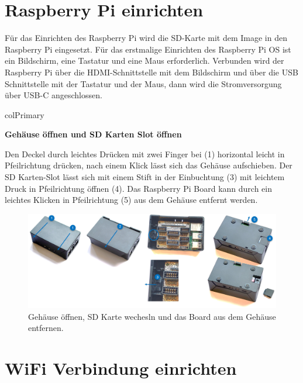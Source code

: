 \documentclass[
  11pt,
  a4paperpaper,
  oneside, openany  ,captions=tableheading
]{scrbook}
\theoremstyle{definition}
\theoremstyle{remark}
\begin{document}
\section{Raspberry Pi einrichten}\label{raspberry-pi-einrichten}

Für das Einrichten des Raspberry Pi wird die SD-Karte mit dem Image in
den Raspberry Pi eingesetzt. Für das erstmalige Einrichten des Raspberry
Pi OS ist ein Bildschirm, eine Tastatur und eine Maus erforderlich.
Verbunden wird der Raspberry Pi über die HDMI-Schnittstelle mit dem
Bildschirm und über die USB Schnittstelle mit der Tastatur und der Maus,
dann wird die Stromversorgung über USB-C angeschlossen.

\begin{boxshade}{colPrimary}

\textbf{Gehäuse öffnen und SD Karten Slot öffnen}

Den Deckel durch leichtes Drücken mit zwei Finger bei (1) horizontal
leicht in Pfeilrichtung drücken, nach einem Klick lässt sich das Gehäuse
aufschieben. Der SD Karten-Slot lässt sich mit einem Stift in der
Einbuchtung (3) mit leichtem Druck in Pfeilrichtung öffnen (4). Das
Raspberry Pi Board kann durch ein leichtes Klicken in Pfeilrichtung (5)
aus dem Gehäuse entfernt werden.

\begin{figure}[H]

{\centering \includegraphics{images/raspberry_pi_oeffnen_sd_karte_wechseln.jpg}

}

\caption{Gehäuse öffnen, SD Karte wechesln und das Board aus dem Gehäuse
entfernen.}

\end{figure}%

\end{boxshade}

\section{WiFi Verbindung einrichten}\label{wifi-verbindung-einrichten}
\end{document}
